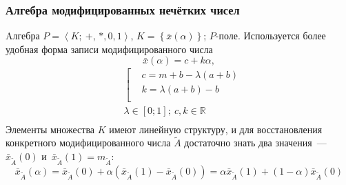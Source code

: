 \documentclass[12pt]{beamer}
\begin{document}

\begin{frame}
  \frametitle{Алгебра модифицированных нечётких чисел}
  Aлгебра $P=\left\langle K ;\ +,\,*, 0, 1 \right\rangle$, $K=\left\lbrace \bar x(\alpha) \right\rbrace$; $P$-поле. Используется более удобная форма записи модифицированного числа
  \begin{equation}
    \bar{x}\left( \alpha  \right)=c+k\alpha,
  \end{equation}
  \begin{equation}
    \label{eq:modified-number-from-abm}
    \begin{aligned}
      & \left[ \begin{aligned}
      & c=m+b-\lambda \left( a+b \right) \\ 
      & k=\lambda \left( a+b \right)-b \\ 
    \end{aligned} \right. \\ 
    & \lambda \in \left[ 0;1 \right];\ c,k\in \mathbb{R} \\ 
  \end{aligned}
  \end{equation}
  Элементы множества $K$ имеют линейную структуру, и для восстановления конкретного модифицированного числа $\tilde{A}$ достаточно знать два значения~--- $\bar{x}_{\tilde A}\left( 0 \right)$ и~$\bar{x}_{\tilde A}\left( 1 \right)=m_{\tilde A}$:
  \begin{equation}
    \label{eq:isomorphic-field}
    \bar{x}_{\tilde A}\left( \alpha \right)=\bar{x}_{\tilde A}\left( 0 \right)+\alpha \left(\bar{x}_{\tilde A}\left( 1 \right)-\bar{x}_{\tilde A}\left(0 \right) \right)=\alpha \bar{x}_{\tilde A}\left( 1 \right)+\left( 1-\alpha  \right) \bar{x}_{\tilde A}\left( 0 \right)
  \end{equation}
\end{frame}
\end{document}
